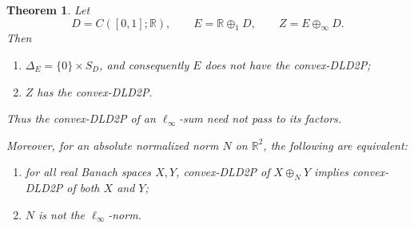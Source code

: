 \documentclass[11pt]{article}
\newtheorem{theorem}{Theorem}
\newcommand{\R}{\mathbb{R}}
\begin{document}
\begin{theorem}\label{thm:main}
Let
\[
 D=C([0,1];\R),\qquad E=\R\oplus_1D,
 \qquad Z=E\oplus_\infty D.
\]
Then
\begin{enumerate}
\item $\Delta_E=\{0\}\times S_D$, and consequently $E$ does not have the
      convex-DLD2P;
\item $Z$ has the convex-DLD2P.
\end{enumerate}
Thus the convex-DLD2P of an $\ell_\infty$-sum need not pass to its factors.

Moreover, for an absolute normalized norm $N$ on $\R^2$, the following are
equivalent:
\begin{enumerate}
\item[(a)] for all real Banach spaces $X,Y$, convex-DLD2P of $X\oplus_NY$
           implies convex-DLD2P of both $X$ and $Y$;
\item[(b)] $N$ is not the $\ell_\infty$-norm.
\end{enumerate}
\end{theorem}
\end{document}
